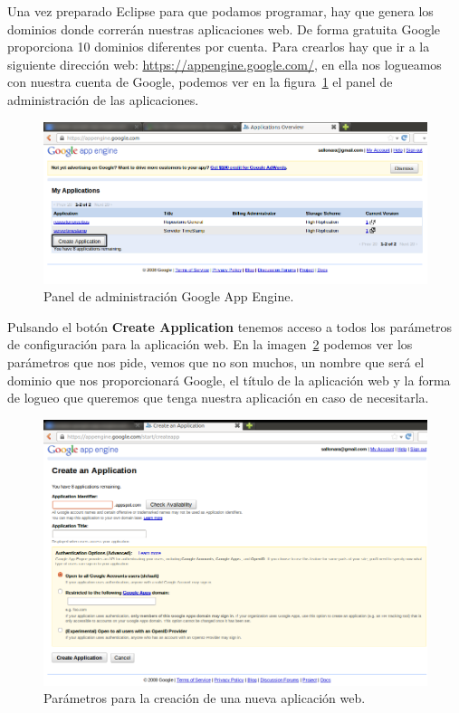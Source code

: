 Una vez preparado Eclipse para que podamos programar, hay que genera los dominios donde correrán nuestras aplicaciones web. De forma gratuita Google proporciona 10 dominios diferentes por cuenta. Para crearlos hay que ir a la siguiente dirección web: \url{https://appengine.google.com/}, en ella nos logueamos con nuestra cuenta de Google, podemos ver en la figura~\ref{fig:appEngine} el panel de administración de las aplicaciones.  

\begin{figure}[hbt]
  \centering
    \includegraphics[scale=0.6]{./AnexoConfiguracionEclipse/imagenes/appEngine.png}
  \caption{Panel de administración Google App Engine.}
  \label{fig:appEngine}
\end{figure}

Pulsando el botón \textbf{Create Application} tenemos acceso a todos los parámetros de configuración para la aplicación web. En la imagen~\ref{fig:createGAE} podemos ver los parámetros que nos pide, vemos que no son muchos, un nombre que será el dominio que nos proporcionará Google, el título de la aplicación web y la forma de logueo que queremos que tenga nuestra aplicación en caso de necesitarla.

\begin{figure}[hbt]
  \centering
    \includegraphics[scale=0.5]{./AnexoConfiguracionEclipse/imagenes/createGAE.png}
  \caption{Parámetros para la creación de una nueva aplicación web.}
  \label{fig:createGAE}
\end{figure}

